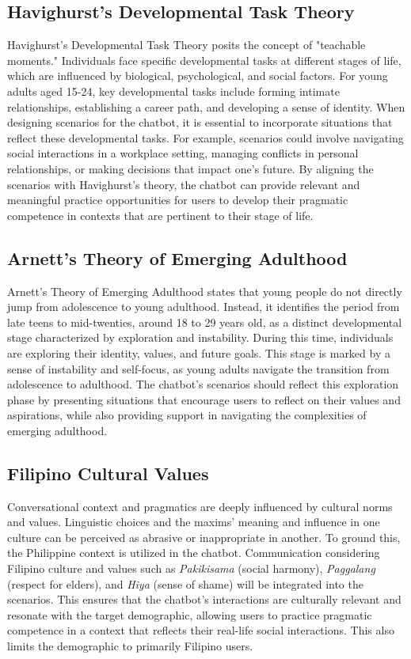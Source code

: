 \subsection{Havighurst's Developmental Task Theory}
Havighurst's Developmental Task Theory posits the concept of "teachable moments." Individuals face specific developmental tasks at different stages of life, which are 
influenced by biological, psychological, and social factors. For young adults aged 15-24, key developmental tasks include forming intimate relationships, establishing a 
career path, and developing a sense of identity. When designing scenarios for the chatbot, it is essential to incorporate situations that reflect these developmental tasks. 
For example, scenarios could involve navigating social interactions in a workplace setting, managing conflicts in personal relationships, or making decisions that impact one's 
future. By aligning the scenarios with Havighurst's theory, the chatbot can provide relevant and meaningful practice opportunities for users to develop their pragmatic 
competence in contexts that are pertinent to their stage of life.

\subsection{Arnett's Theory of Emerging Adulthood}
Arnett's Theory of Emerging Adulthood states that young people do not directly jump from adolescence to young adulthood. Instead, it identifies the period from late teens 
to mid-twenties, around 18 to 29 years old, as a distinct developmental stage characterized by exploration and instability. During this time, individuals are exploring their 
identity, values, and future goals. This stage is marked by a sense of instability and self-focus, as young adults navigate the transition from adolescence to adulthood. 
The chatbot's scenarios should reflect this exploration phase by presenting situations that encourage users to reflect on their values and aspirations, while also providing 
support in navigating the complexities of emerging adulthood.

\subsection{Filipino Cultural Values}
Conversational context and pragmatics are deeply influenced by cultural norms and values. Linguistic choices and the maxims' meaning and influence in one culture can be perceived as abrasive or inappropriate in another. To ground this, the Philippine context is utilized in the chatbot. Communication considering Filipino culture and values such as \textit{Pakikisama} (social harmony), \textit{Paggalang} (respect for elders), and \textit{Hiya} (sense of shame) will be integrated into the scenarios.
This ensures that the chatbot's interactions are culturally relevant and resonate with the target demographic, allowing users to practice pragmatic competence in a context that reflects their real-life social interactions. This also limits the demographic to primarily Filipino users.


